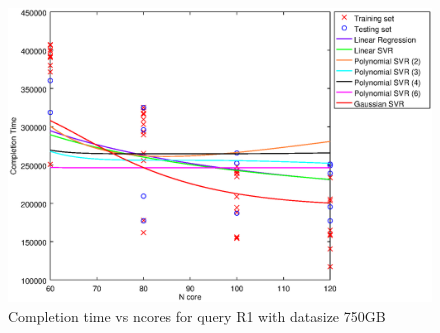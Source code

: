 
\begin {figure}[hbtp]
\centering
\includegraphics[width=\textwidth]{output/R1_750_1_OVER_NCORES/plot_R1_750.eps}
\caption{Completion time vs ncores for query R1 with datasize 750GB}
\label{fig:all_nonlinear_R1_750}
\end {figure}

